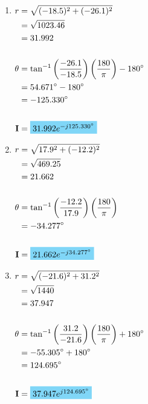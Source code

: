 \begin{enumerate}[leftmargin=2cm,labelsep=.5cm,label=\bfseries\alph*)]
	\item $
	\begin{aligned}[t]
	r &= \sqrt{(-18.5)^2+(-26.1)^2} \\
	&= \sqrt{1023.46} \\
	&= 31.992\\[5mm]
	\theta &= \tan^{-1}\left(\frac{-26.1}{-18.5}\right)\left(\frac{180}{\pi}\right) -180\degree  \\
	&= 54.671\degree - 180\degree \\
	&= -125.330\degree\\[5mm]
	\textbf{I} &= \hlbox{$31.992e^{-j125.330\degree}$}
	\end{aligned} $
	\\[1cm]
	
	\item $
	\begin{aligned}[t]
	r &= \sqrt{17.9^2+(-12.2)^2} \\
	&= \sqrt{469.25} \\
	&= 21.662\\[5mm]
	\theta &= \tan^{-1}\left(\frac{-12.2}{17.9}\right)\left(\frac{180}{\pi}\right)  \\
	&= -34.277\degree\\[5mm]
	\textbf{I} &= \hlbox{$21.662e^{-j34.277\degree}$}
	\end{aligned} $
	\\[1cm]
	
	\item $
	\begin{aligned}[t]
	r &= \sqrt{(-21.6)^2+31.2^2} \\
	&= \sqrt{1440} \\
	&= 37.947\\[5mm]
	\theta &= \tan^{-1}\left(\frac{31.2}{-21.6}\right)\left(\frac{180}{\pi}\right) +180\degree  \\
	&= -55.305\degree +180\degree \\
	&= 124.695\degree\\[5mm]
	\textbf{I} &= \hlbox{$37.947e^{j124.695\degree}$}
	\end{aligned} $
	\\[1cm]	
\end{enumerate}